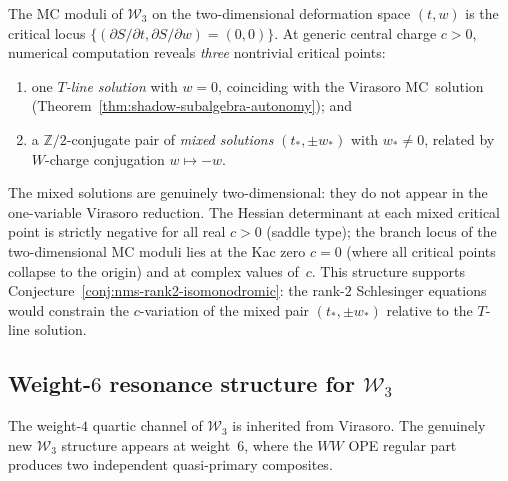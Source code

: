 \begin{remark}
\label{rem:w3-mc-moduli-mixed-critical}%
%
%
The MC moduli of $\mathcal{W}_3$ on the two-dimensional deformation
space $(t,w)$ is the critical locus
$\{(\partial S / \partial t, \partial S / \partial w) = (0,0)\}$.
At generic central charge $c > 0$, numerical computation reveals
\emph{three} nontrivial critical points:
\begin{enumerate}
\item one \emph{$T$-line solution} with $w = 0$, coinciding with the
  Virasoro MC~solution
  (Theorem~\ref{thm:shadow-subalgebra-autonomy}); and
\item a $\mathbb{Z}/2$-conjugate pair of \emph{mixed solutions}
  $(t_*, \pm w_*)$ with $w_* \neq 0$, related by $W$-charge
  conjugation $w \mapsto -w$.
\end{enumerate}
The mixed solutions are genuinely two-dimensional: they do not
appear in the one-variable Virasoro reduction.  The Hessian
determinant at each mixed critical point is strictly negative for
all real $c > 0$ (saddle type); the branch locus of the
two-dimensional MC moduli lies at the Kac zero $c = 0$ (where all
critical points collapse to the origin) and at complex values of~$c$.
This structure supports
Conjecture~\ref{conj:nms-rank2-isomonodromic}: the rank-$2$
Schlesinger equations would constrain the $c$-variation of the
mixed pair $(t_*, \pm w_*)$ relative to the $T$-line solution.
\end{remark}

\subsection{Weight-$6$ resonance structure for \texorpdfstring{$\mathcal{W}_3$}{W3}}
\label{subsec:w-w3-weight6-resonance}

The weight-$4$ quartic channel of $\mathcal{W}_3$ is inherited from
Virasoro.  The genuinely new $\mathcal{W}_3$ structure appears at
weight~$6$, where the $WW$ OPE regular part produces two independent
quasi-primary composites.

